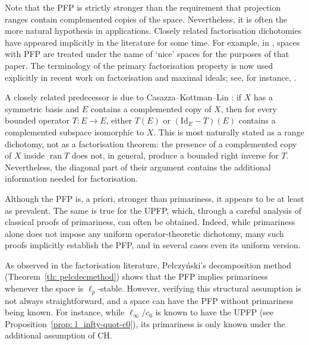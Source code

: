 \documentclass[11pt]{amsart}
\theoremstyle{plain}
\theoremstyle{definition}
\numberwithin{equation}{section}
\newcommand{\Id}{\mathrm{Id}}
\newcommand{\CH}{\mathrm{CH}}
\begin{document}
Note that the PFP is strictly stronger than the requirement that projection ranges contain complemented copies of the space. Nevertheless, it is often the more natural hypothesis in applications. Closely related factorisation dichotomies have appeared implicitly in the literature for some time. For example, in \cite{Drewnowski1989}, spaces with PFP are treated under the name of `nice' spaces for the purposes of that paper. The terminology of the primary factorisation property is now used explicitly in recent work on factorisation and maximal ideals; see, for instance, \cite{KaniaLechner2022, LechnerSpeckhofer2025}.

A closely related predecessor is due to Casazza--Kottman--Lin \cite{CKL1976}: if $X$ has a symmetric basis and $E$ contains a complemented copy of $X$, then for every bounded operator $T\colon E\to E$, either $T(E)$ or $(\Id_E-T)(E)$ contains a complemented subspace isomorphic to $X$.  This is most naturally stated as a range dichotomy, not as a factorisation theorem: the presence of a complemented copy of $X$ inside $\operatorname{ran}T$ does not, in general, produce a bounded right inverse for $T$.  Nevertheless, the diagonal part of their argument contains the additional information needed for factorisation.

Although the PFP is, a priori, stronger than primariness, it appears to be at least as prevalent. The same is true for the UPFP, which, through a careful analysis of classical proofs of primariness, can often be obtained. Indeed, while primariness alone does not impose any uniform operator-theoretic dichotomy, many such proofs implicitly establish the PFP, and in several cases even its uniform version.

As observed in the factorisation literature, Pe{\l}czy\'nski's decomposition method (Theorem~\ref{th: pelcdecmethod}) shows that the PFP implies primariness whenever the space is $\ell_p$-stable. However, verifying this structural assumption is not always straightforward, and a space can have the PFP without primariness being known. For instance, while $\ell_\infty/c_0$ is known to have the UPFP (see Proposition~\ref{prop: l_infty-quot-c0}), its primariness is only known under the additional assumption of $\CH$.
\end{document}
